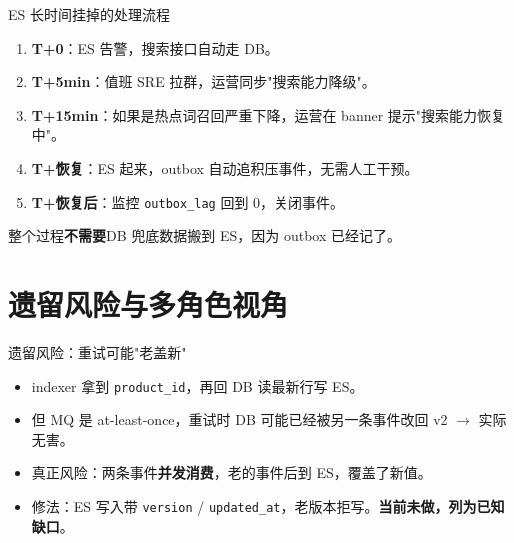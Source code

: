 \begin{frame}{ES 长时间挂掉的处理流程}
\begin{enumerate}
  \item \textbf{T+0}：ES 告警，搜索接口自动走 DB。
  \item \textbf{T+5min}：值班 SRE 拉群，运营同步"搜索能力降级"。
  \item \textbf{T+15min}：如果是热点词召回严重下降，运营在 banner 提示"搜索能力恢复中"。
  \item \textbf{T+恢复}：ES 起来，outbox 自动追积压事件，无需人工干预。
  \item \textbf{T+恢复后}：监控 \texttt{outbox\_lag} 回到 0，关闭事件。
\end{enumerate}
\vspace{2mm}
\small 整个过程\textbf{不需要}DB 兜底数据搬到 ES，因为 outbox 已经记了。
\end{frame}

\section{遗留风险与多角色视角}

\begin{frame}{遗留风险：重试可能"老盖新"}
\vspace{2mm}
\begin{itemize}
  \item indexer 拿到 \texttt{product\_id}，再回 DB 读最新行写 ES。
  \item 但 MQ 是 at-least-once，重试时 DB 可能已经被另一条事件改回 v2 $\to$ 实际无害。
  \item 真正风险：两条事件\textbf{并发消费}，老的事件后到 ES，覆盖了新值。
  \item 修法：ES 写入带 \texttt{version} / \texttt{updated\_at}，老版本拒写。\textbf{当前未做，列为已知缺口}。
\end{itemize}
\end{frame}

